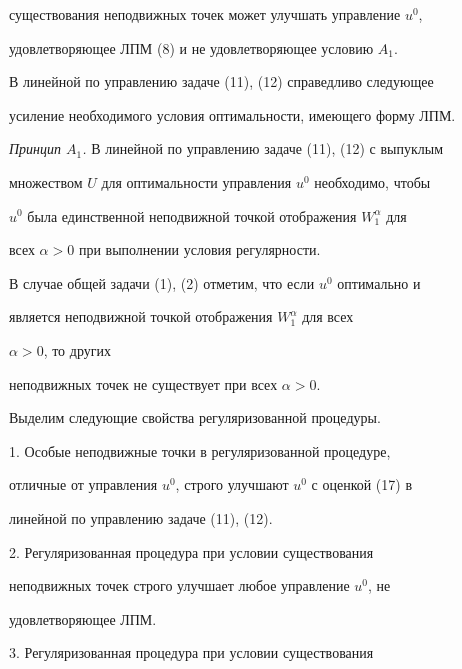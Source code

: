 существования неподвижных точек может улучшать управление $u^0$, 


удовлетворяющее ЛПМ (8) и не удовлетворяющее условию $A_1$. 


 


В линейной по управлению задаче (11), (12) справедливо следующее 


усиление необходимого условия оптимальности, имеющего форму ЛПМ. 


\medskip 


 


{\it Принцип $A_1$.} В линейной по управлению задаче (11), (12) с выпуклым 


множеством $U$ для оптимальности управления $u^0$ необходимо, чтобы 


$u^0$ была единственной неподвижной точкой отображения $W^\alpha_1$ для 


всех $\alpha>0$ при выполнении условия регулярности. 


\medskip 


 


В случае общей задачи (1), (2) отметим, что если $u^0$ оптимально и 


является неподвижной точкой отображения $W^\alpha_1$ для всех 


$\alpha>0$, то других 


неподвижных точек не существует при всех $\alpha>0$. 


 


Выделим следующие свойства регуляризованной процедуры. 


 


1. Особые неподвижные точки в регуляризованной процедуре, 


отличные от управления $u^0$, строго улучшают $u^0$ с оценкой (17) в 


линейной по управлению задаче (11), (12). 


 


2. Регуляризованная процедура при условии существования 


неподвижных точек строго улучшает любое управление $u^0$, не 


удовлетворяющее ЛПМ. 


 


3. Регуляризованная процедура при условии существования 


